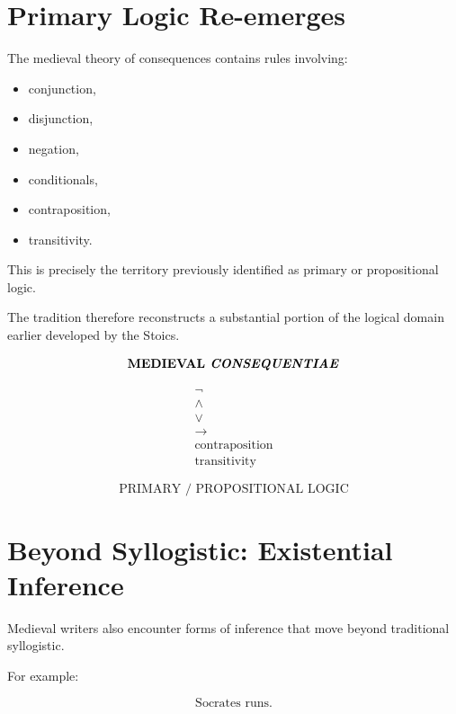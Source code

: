 \documentclass[11pt]{article}
\newcommand{\latin}[1]{\textit{#1}}
\begin{document}
\section{Primary Logic Re-emerges}

The medieval theory of consequences contains rules involving:

\begin{itemize}
    \item conjunction,
    \item disjunction,
    \item negation,
    \item conditionals,
    \item contraposition,
    \item transitivity.
\end{itemize}

This is precisely the territory previously identified as primary
or propositional logic.

The tradition therefore reconstructs a substantial portion of the
logical domain earlier developed by the Stoics.

\begin{whiteboard}
\[
\textbf{MEDIEVAL \latin{CONSEQUENTIAE}}
\]

\[
\begin{array}{c}
\neg\\
\land\\
\lor\\
\rightarrow\\
\text{contraposition}\\
\text{transitivity}
\end{array}
\]

\[
\boxed{\text{PRIMARY / PROPOSITIONAL LOGIC}}
\]
\end{whiteboard}

\section{Beyond Syllogistic: Existential Inference}

Medieval writers also encounter forms of inference that move
beyond traditional syllogistic.

For example:

\[
\text{Socrates runs.}
\]
\end{document}
